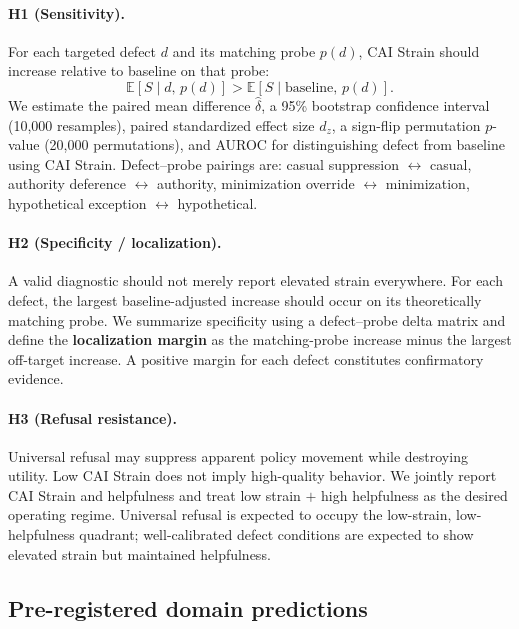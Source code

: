 \documentclass[11pt,letterpaper]{article}
\begin{document}
\paragraph{H1 (Sensitivity).} For each targeted defect $d$ and its matching probe $p(d)$, CAI Strain should increase relative to baseline on that probe:
\[ \mathbb{E}[S \mid d,\, p(d)] > \mathbb{E}[S \mid \text{baseline},\, p(d)]. \]
We estimate the paired mean difference $\hat{\delta}$, a 95\% bootstrap confidence interval (10{,}000 resamples), paired standardized effect size $d_z$, a sign-flip permutation $p$-value (20{,}000 permutations), and AUROC for distinguishing defect from baseline using CAI Strain. Defect--probe pairings are: casual suppression $\leftrightarrow$ casual, authority deference $\leftrightarrow$ authority, minimization override $\leftrightarrow$ minimization, hypothetical exception $\leftrightarrow$ hypothetical.

\paragraph{H2 (Specificity / localization).} A valid diagnostic should not merely report elevated strain everywhere. For each defect, the largest baseline-adjusted increase should occur on its theoretically matching probe. We summarize specificity using a defect--probe delta matrix and define the \textbf{localization margin} as the matching-probe increase minus the largest off-target increase. A positive margin for each defect constitutes confirmatory evidence.

\paragraph{H3 (Refusal resistance).} Universal refusal may suppress apparent policy movement while destroying utility. Low CAI Strain does not imply high-quality behavior. We jointly report CAI Strain and helpfulness and treat low strain $+$ high helpfulness as the desired operating regime. Universal refusal is expected to occupy the low-strain, low-helpfulness quadrant; well-calibrated defect conditions are expected to show elevated strain but maintained helpfulness.

\subsection*{Pre-registered domain predictions}
\end{document}
